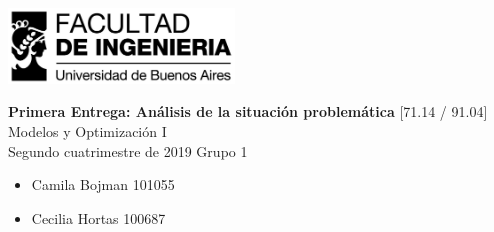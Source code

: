 \documentclass[a4paper]{article}
\newcommand{\materia}{[71.14 / 91.04] Modelos y Optimización I}
\newcommand{\trabajo}{Primera Entrega: Análisis de la situación problemática}
\newcommand{\cuatrimestre}{Segundo cuatrimestre de 2019}
\newcommand{\grupo}{Grupo 1}
\begin{document}
\setcounter{page}{1}
	
\begin{titlepage}
	\hfill\includegraphics[width=6cm]{fiuba.jpg}
    \begin{center}
    \vfill
    \Huge \textbf{\trabajo}
    \vskip2cm
    \Large \materia\\
    \cuatrimestre
    \vfill
    \grupo
	\begin{itemize}
		\item Camila Bojman 101055
		\item Cecilia Hortas 100687
	\end{itemize}
    \vskip1cm
    \end{center}
\end{titlepage}
\end{document}
